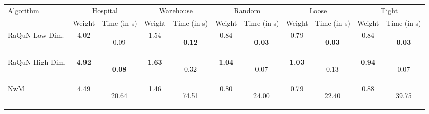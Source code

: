 \begin{tabular}{  l  c  c  c  c  c  c  c  c  c  c }
\hline
Algorithm & \multicolumn{2}{c}{Hospital} & \multicolumn{2}{c}{Warehouse} & \multicolumn{2}{c}{Random} & \multicolumn{2}{c}{Loose} & \multicolumn{2}{c}{Tight} \\
 & Weight & Time (in s) & Weight & Time (in s) & Weight & Time (in s) & Weight & Time (in s) & Weight & Time (in s) \\
\hline
RaQuN Low Dim. & 4.02  & 0.09 \begin{tiny}[0.08, 0.12]\end{tiny} & 1.54  & \textbf{0.12} \begin{tiny}[0.11, 0.16]\end{tiny} & 0.84  & \textbf{0.03} \begin{tiny}[0.02, 0.13]\end{tiny} & 0.79  & \textbf{0.03} \begin{tiny}[0.02, 0.10]\end{tiny} & 0.84  & \textbf{0.03} \begin{tiny}[0.02, 0.09]\end{tiny} \\
RaQuN High Dim. & \textbf{4.92}  & \textbf{0.08} \begin{tiny}[0.07, 0.12]\end{tiny} & \textbf{1.63}  & 0.32 \begin{tiny}[0.27, 0.93]\end{tiny} & \textbf{1.04}  & 0.07 \begin{tiny}[0.05, 0.13]\end{tiny} & \textbf{1.03}  & 0.13 \begin{tiny}[0.07, 0.33]\end{tiny} & \textbf{0.94}  & 0.07 \begin{tiny}[0.05, 0.11]\end{tiny} \\
NwM & 4.49  & 20.64 \begin{tiny}[16.18, 24.22]\end{tiny} & 1.46  & 74.51 \begin{tiny}[29.53, 84.87]\end{tiny} & 0.80  & 24.00 \begin{tiny}[1.23, 76.02]\end{tiny} & 0.79  & 22.40 \begin{tiny}[1.12, 70.68]\end{tiny} & 0.88  & 39.75 \begin{tiny}[1.63, 66.60]\end{tiny} \\

\end{tabular}
